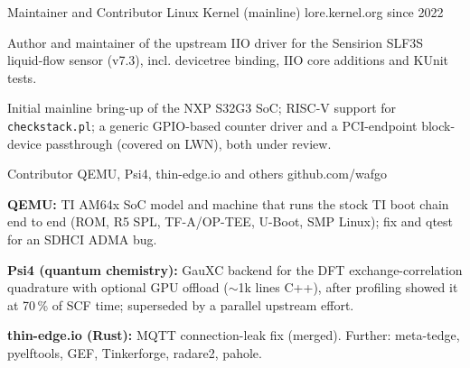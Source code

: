 

\begin{cventries}

  \cventry
    {Maintainer and Contributor} %
    {Linux Kernel (mainline)} %
    {lore.kernel.org} %
    {since 2022} %
    {
      \begin{cvitems}
        \item {Author and maintainer of the upstream IIO driver for the Sensirion SLF3S liquid-flow sensor (v7.3), incl. devicetree binding, IIO core additions and KUnit tests.}
        \item {Initial mainline bring-up of the NXP S32G3 SoC; RISC-V support for \texttt{checkstack.pl}; a generic GPIO-based counter driver and a PCI-endpoint block-device passthrough (covered on LWN), both under review.}
      \end{cvitems}
    }

  \cventry
    {Contributor} %
    {QEMU, Psi4, thin-edge.io and others} %
    {github.com/wafgo} %
    {} %
    {
      \begin{cvitems}
        \item {\textbf{QEMU:} TI AM64x SoC model and machine that runs the stock TI boot chain end to end (ROM, R5 SPL, TF-A/OP-TEE, U-Boot, SMP Linux); fix and qtest for an SDHCI ADMA bug.}
        \item {\textbf{Psi4 (quantum chemistry):} GauXC backend for the DFT exchange-correlation quadrature with optional GPU offload ($\sim$1k lines C++), after profiling showed it at 70\,\% of SCF time; superseded by a parallel upstream effort.}
        \item {\textbf{thin-edge.io (Rust):} MQTT connection-leak fix (merged). Further: meta-tedge, pyelftools, GEF, Tinkerforge, radare2, pahole.}
      \end{cvitems}
    }

\end{cventries}
